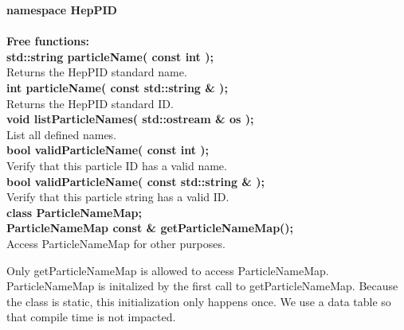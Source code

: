 \begin{tabbing}

{\bf namespace HepPID} \\  \\

{\bf Free functions:} \\

\hspace{0.5in} {\bf std::string  particleName( const int );} \\
\hspace{1.0in}  Returns the HepPID standard name. \\

\hspace{0.5in} {\bf int  particleName( const std::string \& );} \\
\hspace{1.0in}  Returns the HepPID standard ID. \\

\hspace{0.5in} {\bf void  listParticleNames( std::ostream \& os );} \\
\hspace{1.0in} List all defined names.  \\

\hspace{0.5in} {\bf bool validParticleName( const int );} \\
\hspace{1.0in} Verify that this particle ID has a valid name.  \\

\hspace{0.5in} {\bf bool validParticleName( const std::string \& );} \\
\hspace{1.0in} Verify that this particle string has a valid ID.  \\

\hspace{0.5in} {\bf class ParticleNameMap;} \\
\hspace{0.5in} {\bf ParticleNameMap const \&  getParticleNameMap();} \\
\hspace{1.0in} Access ParticleNameMap for other purposes.  \\
\end{tabbing}

Only getParticleNameMap is allowed to access ParticleNameMap.
ParticleNameMap is initalized by the first call to getParticleNameMap.
Because the class is static, this initialization only happens once.
We use a data table so that compile time is not impacted.

